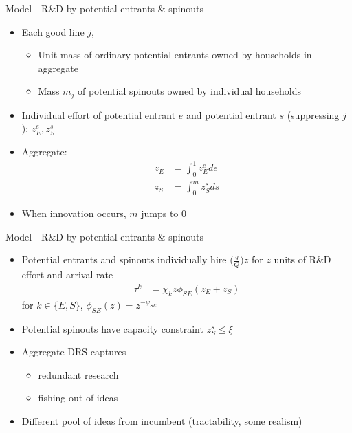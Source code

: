 \documentclass[english,usenames,dvipsnames]{beamer}
\begin{document}

\begin{frame}{Model - R\&D by potential entrants \& spinouts}
\begin{itemize}
	\item Each good line $j$,
	\begin{itemize}
		\item Unit mass of ordinary \alert{potential entrants} owned by households in aggregate
		\item Mass $m_j$ of \alert{potential spinouts} owned by individual households
	\end{itemize}
	\item Individual effort of potential entrant $e$ and potential entrant $s$ (suppressing $j$): $z_E^e, z_S^s$ 
	\item Aggregate: 
	\begin{align*}
		z_E &= \int_0^1 z_E^e de \\
		z_S &= \int_0^m z_S^s ds 
	\end{align*}
	\item When innovation occurs, \alert{$m$ jumps to 0}
\end{itemize}
\end{frame}


\begin{frame}{Model - R\&D by potential entrants \& spinouts}
\begin{itemize}
	\item Potential entrants and spinouts individually hire $\big(\frac{q}{Q}\big)z$ for $z$ units of R\&D effort and arrival rate  
	\begin{align*}
	\tau^k &= \chi_{k} z \phi_{SE} (z_E + z_S)
	\end{align*}
	for $k \in \{E,S\}$, $\phi_{SE}(z) = z^{-\psi_{SE}}$
	\item Potential spinouts have \alert{capacity constraint} $z_S^s \le \xi$
	\item Aggregate DRS captures
	\begin{itemize}
		\item \alert{redundant} research
		\item fishing out of ideas
	\end{itemize} 
	\item \alert{Different pool of ideas} from incumbent (tractability, some realism)
\end{itemize}
\end{frame}
\end{document}
